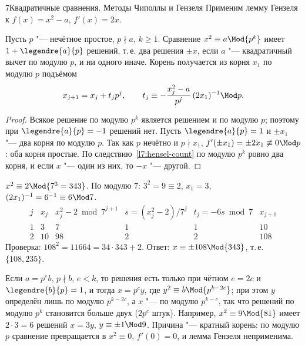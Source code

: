 \begin{lecture}{7}{Квадратичные сравнения. Методы Чиполлы и Гензеля}
Применим лемму Гензеля к $f(x) = x^2 - a$, $f'(x) = 2x$.

\begin{theorem}\label{l7:sqrt-pk}
Пусть $p$ "--- нечётное простое, $p \nmid a$, $k \ge 1$. Сравнение $x^2 \equiv a \Mod{p^k}$ имеет
$1 + \legendre{a}{p}$ решений, т.\,е. два решения $\pm x$, если $a$ "--- квадратичный вычет по
модулю $p$, и ни одного иначе. Корень получается из корня $x_1$ по модулю $p$ подъёмом
\[
  x_{j+1} = x_j + t_j p^j, \qquad
  t_j \equiv -\frac{x_j^2 - a}{p^j}\,(2x_1)^{-1} \Mod p .
\]
\end{theorem}

\begin{proof}
Всякое решение по модулю $p^k$ является решением и по модулю $p$; поэтому при
$\legendre{a}{p} = -1$ решений нет. Пусть $\legendre{a}{p} = 1$ и $\pm x_1$ "--- два корня по модулю
$p$. Так как $p$ нечётно и $p \nmid x_1$, $f'(\pm x_1) = \pm 2x_1 \not\equiv 0 \Mod p$: оба
корня простые. По следствию~\ref{l7:hensel-count} по модулю $p^k$ ровно два корня, и если $x$ "---
один из них, то $-x$ "--- другой.
\end{proof}

\begin{example}\label{l7:ex-hensel}
$x^2 \equiv 2 \Mod{7^3 = 343}$. По модулю $7$: $3^2 = 9 \equiv 2$, $x_1 = 3$,
$(2x_1)^{-1} = 6^{-1} \equiv 6 \Mod 7$.
\[
  \begin{array}{c|r|r|r|r|r}
    j & x_j & x_j^2 - 2 \bmod 7^{j+1} & s = (x_j^2 - 2)/7^j & t_j = -6s \bmod 7 & x_{j+1} \\ \hline
    1 & 3 & 7 & 1 & 1 & 10 \\
    2 & 10 & 98 & 2 & 2 & 108
  \end{array}
\]
Проверка: $108^2 = 11664 = 34 \cdot 343 + 2$. Ответ: $x \equiv \pm 108 \Mod{343}$, т.\,е.
$\{108, 235\}$.
\end{example}


\begin{remark}
Если $a = p^{e} b$, $p \nmid b$, $e < k$, то решения есть только при чётном $e = 2c$ и
$\legendre{b}{p} = 1$, и тогда $x = p^{c} y$, где $y^2 \equiv b \Mod{p^{k - 2c}}$; при этом $y$
определён лишь по модулю $p^{k-2c}$, а $x$ "--- по модулю $p^{k - c}$, так что решений по модулю
$p^k$ становится больше двух ($2p^{c}$ штук). Например, $x^2 \equiv 9 \Mod{81}$ имеет $2 \cdot 3 = 6$ решений
$x = 3y$, $y \equiv \pm 1 \Mod 9$. Причина "--- кратный корень: по модулю $p$ сравнение
превращается в $x^2 \equiv 0$, $f'(0) = 0$, и лемма Гензеля неприменима.
\end{remark}


\end{lecture}
